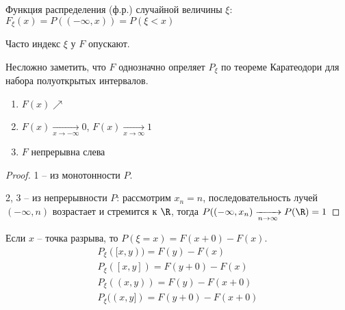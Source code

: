 \begin{Def}
Функция распределения (ф.р.) случайной величины $\xi$: $F_{\xi}(x) = P((-\infty, x)) = P(\xi < x)$
\end{Def}
\begin{Rem}
Часто индекс $\xi$ у $F$ опускают.
\end{Rem}

Несложно заметить, что $F$ однозначно опреляет $P_{\xi}$ по теореме Каратеодори для набора полуоткрытых интервалов.

\begin{theorem}

\begin{enumerate}

\item $F(x) \nearrow$
\item $F(x) \xrightarrow[x \to -\infty]{} 0$, $F(x) \xrightarrow[x \to \infty]{} 1$
\item $F$ непрерывна слева
\end{enumerate}
\end{theorem}
\begin{proof}
1 -- из монотонности $P$.

2, 3 -- из непрерывности $P$: рассмотрим $x_n = n$, последовательность лучей $(-\infty, n)$ возрастает и стремится к $\R$, тогда $P((-\infty, x_n) \xrightarrow[n \to \infty]{} P(\R) = 1$
\end{proof}

Если $x$ -- точка разрыва, то $P(\xi = x) = F(x + 0) - F(x)$.
\begin{gather*}
P_{\xi}([x, y)) = F(y) - F(x)\\
P_{\xi}([x, y]) = F(y + 0) - F(x)\\
P_{\xi}((x, y)) = F(y) - F(x + 0)\\
P_{\xi}((x, y]) = F(y + 0) - F(x + 0)
\end{gather*}

